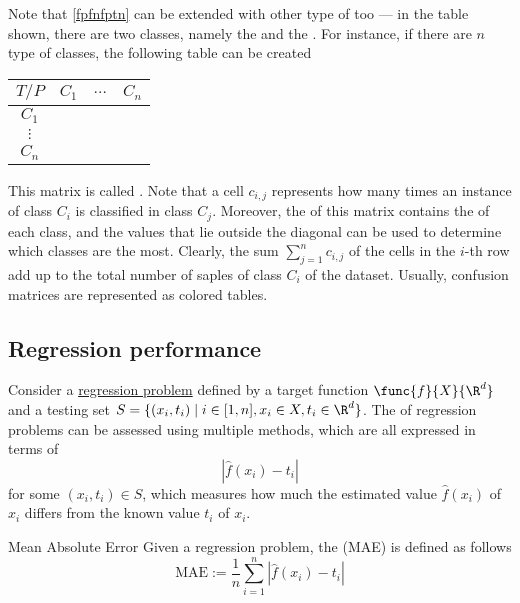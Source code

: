 \documentclass[a4paper, 12pt]{report}
\begin{document}
    Note that \cref{fpfnfptn} can be extended with other type of  too --- in the table shown, there are two classes, namely the  and the . For instance, if there are $n$ type of classes, the following table can be created
    
    \begin{table}[H]
        \centering
        \begin{tabular}{|c|c|c|c|}
            \hline
            $T/P$ & $C_1$ & $\ldots$ & $C_n$ \\
            \hline
            $C_1$ & & & \\
            \hline
            $\vdots$ & & & \\
            \hline
            $C_n$ & & & \\
            \hline
        \end{tabular}
    \end{table}

    This matrix is called . Note that a cell $c_{i, j}$ represents how many times an instance of class $C_i$ is classified in class $C_j$. Moreover, the  of this matrix contains the  of each class, and the values that lie outside the diagonal can be used to determine which classes are  the most. Clearly, the sum $\sum_{j = 1}^n {c_{i, j}}$ of the cells in the $i$-th row add up to the total number of saples of class $C_i$ of the dataset. Usually, confusion matrices are represented as colored tables.


    \subsection{Regression performance}

    Consider a \href{https://en.wikipedia.org/wiki/Regression_analysis}{regression problem} defined by a target function $\func{f}{X}{\R^d}$ and a testing set $S = \{(x_i, t_i) \mid i \in [1, n], x_i \in X, t_i \in \R^d\}$. The  of regression problems can be assessed using multiple methods, which are all expressed in terms of $$|\hat f(x_i) - t_i|$$ for some $(x_i, t_i) \in S$, which measures how much the estimated value $\hat f(x_i)$ of $x_i$ differs from the known value $t_i$ of $x_i$.

    \begin{frameddefn}{Mean Absolute Error}
        Given a regression problem, the  (MAE) is defined as follows $$\mathrm{MAE} := \dfrac{1}{n} \sum_{i = 1}^n {|\hat f(x_i) - t_i|}$$
    \end{frameddefn}
\end{document}

